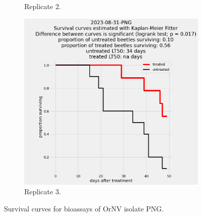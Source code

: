 \documentclass[12pt,letterpaper,english,bibliography=totocnumbered, abstract=on]{scrartcl}
\begin{document}
\begin{figure}[h]
\begin{subfigure}{.3\textwidth}
		\caption{Replicate 2.}
	\end{subfigure}
	\begin{subfigure}{.3\textwidth}
		\includegraphics[width=\textwidth]{images/survival_curves/2023-08-31-PNG}
		\caption{Replicate 3.}
	\end{subfigure}
	\caption{Survival curves for bioassays of OrNV isolate PNG.}
	\label{fig:PNG survival curves}
\end{figure}

\end{document}

